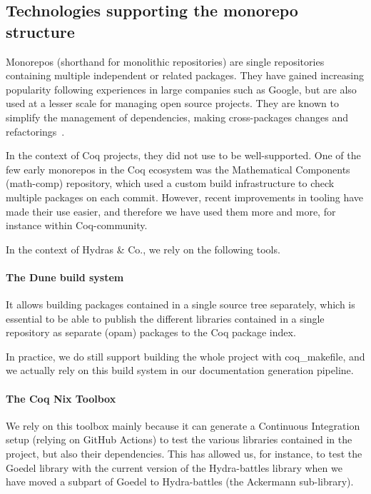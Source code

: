 \documentclass{easychair}
\newcommand{\community}{Coq-community\xspace}
\newcommand{\Hydras}{Hydras \& Co.\xspace}
\begin{document}
\subsection{Technologies supporting the monorepo structure}

Monorepos (shorthand for monolithic repositories) are single repositories containing multiple independent or related packages.
%
They have gained increasing popularity following experiences in large companies such as Google, but are also used at a lesser scale for managing open source projects.
%
They are known to simplify the management of dependencies, making cross-packages changes and refactorings~\cite{brito2018monorepos}.

In the context of Coq projects, they did not use to be well-supported.
%
One of the few early monorepos in the Coq ecosystem was the Mathematical Components (math-comp) repository, which used a custom build infrastructure to check multiple packages on each commit.
%
However, recent improvements in tooling have made their use easier, and therefore we have used them more and more, for instance within \community.

In the context of \Hydras, we rely on the following tools.

\paragraph{The Dune build system}
It allows building packages contained in a single source tree separately, which is essential to be able to publish the different libraries contained in a single repository as separate (opam) packages to the Coq package index.

In practice, we do still support building the whole project with coq\_makefile, and we actually rely on this build system in our documentation generation pipeline.

\paragraph{The Coq Nix Toolbox~\cite{cohen:hal-03366644}}
We rely on this toolbox mainly because it can generate a Continuous Integration setup (relying on GitHub Actions) to test the various libraries contained in the project, but also their dependencies.
%
This has allowed us, for instance, to test the Goedel library with the current version of the Hydra-battles library when we have moved a subpart of Goedel to Hydra-battles (the Ackermann sub-library).
\end{document}
